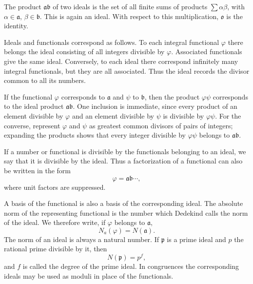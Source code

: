 \documentclass[11pt,a4paper]{book}
\begin{document}
The product \(\mathfrak a\mathfrak b\) of two ideals is the set of all finite sums of products \(\sum \alpha\beta\), with \(\alpha\in\mathfrak a\), \(\beta\in\mathfrak b\).  This is again an ideal.  With respect to this multiplication, \(\mathfrak o\) is the identity.

Ideals and functionals correspond as follows.  To each integral functional \(\varphi\) there belongs the ideal consisting of all integers divisible by \(\varphi\).  Associated functionals give the same ideal.  Conversely, to each ideal there correspond infinitely many integral functionals, but they are all associated.  Thus the ideal records the divisor common to all its numbers.

If the functional \(\varphi\) corresponds to \(\mathfrak a\) and \(\psi\) to \(\mathfrak b\), then the product \(\varphi\psi\) corresponds to the ideal product \(\mathfrak a\mathfrak b\).  One inclusion is immediate, since every product of an element divisible by \(\varphi\) and an element divisible by \(\psi\) is divisible by \(\varphi\psi\).  For the converse, represent \(\varphi\) and \(\psi\) as greatest common divisors of pairs of integers; expanding the products shows that every integer divisible by \(\varphi\psi\) belongs to \(\mathfrak a\mathfrak b\).

If a number or functional is divisible by the functionals belonging to an ideal, we say that it is divisible by the ideal.  Thus a factorization of a functional can also be written in the form
\begin{equation}
 \varphi=\mathfrak a\mathfrak b\cdots, \tag{1}
\end{equation}
where unit factors are suppressed.

A basis of the functional is also a basis of the corresponding ideal.  The absolute norm of the representing functional is the number which Dedekind calls the norm of the ideal.  We therefore write, if \(\varphi\) belongs to \(\mathfrak a\),
\begin{equation}
 N_a(\varphi)=N(\mathfrak a). \tag{2}
\end{equation}
The norm of an ideal is always a natural number.  If \(\mathfrak p\) is a prime ideal and \(p\) the rational prime divisible by it, then
\begin{equation}
 N(\mathfrak p)=p^f, \tag{3}
\end{equation}
and \(f\) is called the degree of the prime ideal.  In congruences the corresponding ideals may be used as moduli in place of the functionals.
\end{document}
